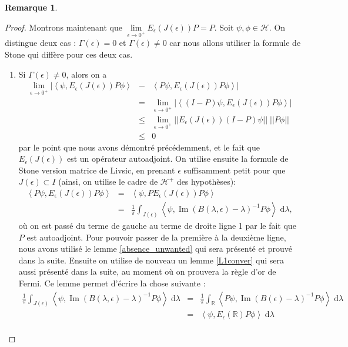 \documentclass[12pt,openany,a4paper, titlepage]{article}
\newcommand{\f}[2]{\frac{#1}{#2}}
\newcommand{\la}{\left\langle}
\newcommand{\ra}{\right\rangle}
\newcommand{\dd}{\;\mathrm{d}}
\newcommand{\R}{\mathbb{R}}
\newcommand{\HH}{\mathcal{H}}
\newcommand{\im}{\operatorname{Im}}
\theoremstyle{definition}
\theoremstyle{definition}
\theoremstyle{definition}
\theoremstyle{definition}
\theoremstyle{definition}
\newtheorem{rem}{Remarque}
\theoremstyle{definition}
\begin{document}
\begin{rem}
\begin{proof}
Montrons maintenant que $\lim\limits_{\epsilon\rightarrow 0^+} E_{\epsilon} (J(\epsilon))P = P$. Soit $\psi,\phi\in\mathcal{H}$. On distingue deux cas : $\Gamma(\epsilon) = 0$ et $\Gamma(\epsilon) \neq 0$ car nous allons utiliser la formule de Stone qui diffère pour ces deux cas.
\begin{enumerate}
    \item Si $\Gamma(\epsilon) \neq 0$, alors on a 
    \begin{eqnarray}
        \lim\limits_{\epsilon\rightarrow 0^+}\left|\la \psi , E_{\epsilon} (J(\epsilon))P \phi \ra\right. &-& \left. \la P\psi , E_{\epsilon} (J(\epsilon))P \phi \ra \right| \\ &=& \lim\limits_{\epsilon\rightarrow 0^+} \left|\la (I-P)\psi , E_{\epsilon} (J(\epsilon))P \phi \ra\right| \\
        &\leq& \lim\limits_{\epsilon\rightarrow 0^+} ||E_{\epsilon}(J(\epsilon))(I-P)\psi||\; ||P \phi|| \\
        &\leq& 0
    \end{eqnarray}
par le point que nous avons démontré précédemment, et le fait que $E_{\epsilon}(J(\epsilon))$ est un opérateur autoadjoint. On utilise ensuite la formule de Stone version matrice de Livsic, en prenant $\epsilon$ suffisamment petit pour que $J(\epsilon) \subset I$ (ainsi, on utilise le cadre de $\HH^+$ des hypothèses):
\begin{eqnarray}
    \la P\psi , E_{\epsilon} (J(\epsilon))P \phi \ra &=&\la \psi , PE_{\epsilon} (J(\epsilon))P \phi \ra \\
    &=& \f{1}{\pi} \int_{J(\epsilon)} \la \psi , \im(B(\lambda,\epsilon) - \lambda)^{-1} P\phi \ra \dd \lambda, 
\end{eqnarray}
où on est passé du terme de gauche au terme de droite ligne 1 par le fait que $P$ est autoadjoint. Pour pouvoir passer de la première à la deuxième ligne, nous avons utilisé le lemme \ref{absence_unwanted} qui sera présenté et prouvé dans la suite. Ensuite on utilise de nouveau un lemme \ref{L1conver} qui sera aussi présenté dans la suite, au moment où on prouvera la règle d'or de Fermi. Ce lemme permet d'écrire la chose suivante :
\begin{eqnarray}
    \f{1}{\pi} \int_{J(\epsilon)} \la \psi , \im(B(\lambda,\epsilon) - \lambda)^{-1} P\phi \ra \dd \lambda &=&  \f{1}{\pi} \int_{\R} \la P\psi , \im(B(\epsilon) - \lambda)^{-1} P\phi \ra \dd \lambda \\
    &=& \la \psi , E_\epsilon(\R) P\phi \ra \dd \lambda \\

\end{eqnarray}
\end{enumerate}
\end{proof}
\end{rem}
\end{document}
